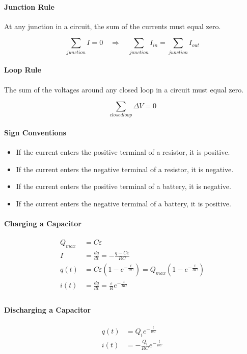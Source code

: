 \paragraph*{Junction Rule}
At any junction in a circuit, the sum of the currents must equal zero.

\begin{equation*}
    \sum_{junction} I = 0 \quad \Longrightarrow \quad \sum_{junction} I_{in} = \sum_{junction} I_{out}
\end{equation*}

\paragraph*{Loop Rule}
The sum of the voltages around any closed loop in a circuit must equal zero.

\begin{equation*}
    \sum_{closed loop} \Delta V = 0
\end{equation*}

\paragraph*{Sign Conventions}
\begin{itemize}
    \item If the current enters the positive terminal of a resistor, it is positive.
    \item If the current enters the negative terminal of a resistor, it is negative.
    \item If the current enters the positive terminal of a battery, it is negative.
    \item If the current enters the negative terminal of a battery, it is positive.
\end{itemize}

\hrulefill

\paragraph*{Charging a Capacitor}

\begin{align*}
    Q_{max} &= C\varepsilon\\
    I &= \frac{dq}{dt} = -\frac{q-C\varepsilon}{RC}\\
    q(t) &= C\varepsilon(1-e^{-\frac{t}{RC}}) = Q_{max}(1-e^{-\frac{t}{RC}})\\
    i(t) &= \frac{dq}{dt} = \frac{\varepsilon}{R}e^{-\frac{t}{RC}}\\
\end{align*}


\paragraph*{Discharging a Capacitor}
\begin{align*}
    q(t) &= Q_ie^{-\frac{t}{RC}}\\
    i(t) &= -\frac{Q_i}{RC}e^{-\frac{t}{RC}}\\
\end{align*}

